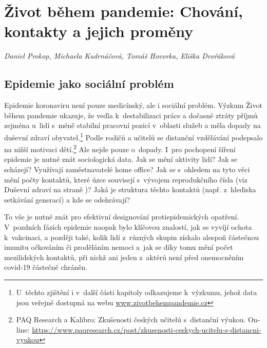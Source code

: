 \chapter[Život během pandemie: Chování a kontakty]{Život během pandemie: Chování, kontakty a jejich proměny}\label{Zmeny_chovani}

\textit{Daniel Prokop, Michaela Kudrnáčová, Tomáš Hovorka, Eliška Dvořáková}
\vspace{15mm}

\section*{Epidemie jako sociální problém}

Epidemie koronaviru není pouze medicínský, ale i sociální problém. Výzkum Život během pandemie ukazuje, že vedla k destabilizaci práce a dočasné ztráty příjmů zejména u~lidí s méně stabilní pracovní pozicí v oblasti služeb a měla dopady na duševní zdraví obyvatel.\footnote{U těchto zjištění i v další části kapitoly odkazujeme k výzkumu, jehož data jsou veřejně dostupná na webu \url{www.zivotbehempandemie.cz}}  Podle rodičů a učitelů se distanční vzdělávání podepsalo na nižší motivaci dětí.\footnote{PAQ Research a Kalibro: Zkušenosti českých učitelů s~distanční výukou. On-line: \url{https://www.paqresearch.cz/post/zkusenosti-ceskych-ucitelu-s-distancni-vyukou}} Ale nejde pouze o~dopady. I~pro pochopení šíření epidemie je nutné znát sociologická data. Jak se mění aktivity lidí? Jak se scházejí? Využívají zaměstnavatelé home office? Jak se s ohledem na tyto věci mění počty kontaktů, které úzce souvisejí s vývojem reprodukčního čísla (viz Duševní zdraví na straně \pageref{Dusevni_zdravi})? Jaká je struktura těchto kontaktů (např. z~hlediska setkávání generací) a kde se odehrávají?

To vše je nutné znát pro efektivní designování protiepidemických opatření. V pozdních fázích epidemie naopak bylo klíčovou znalostí, jak se vyvíjí ochota k vakcinaci, a později také, kolik lidí z různých skupin získalo alespoň částečnou imunitu očkováním či proděláním nemoci a jak se díky tomu mění počet mezilidských kontaktů, při nichž ani jeden z aktérů není před onemocněním covid-19 částečně chráněn.

